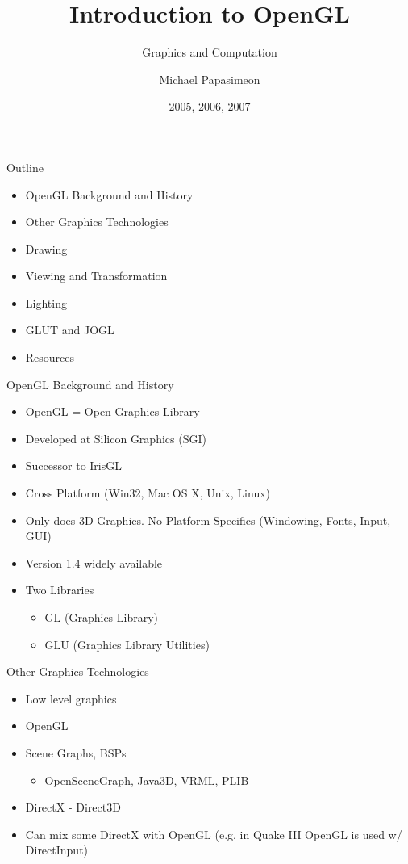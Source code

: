 \documentclass[xcolor=dvipsnames,t]{beamer}
\title[OpenGL]{Introduction to OpenGL}
\subtitle{Graphics and Computation}
\author{Michael Papasimeon} %
\date{2005, 2006, 2007}
\begin{document}
\begin{frame}
    \maketitle
\end{frame} 

\begin{frame}{Outline}
    \begin{itemize}
        \item OpenGL Background and History
        \item Other Graphics Technologies
        \item Drawing
        \item Viewing and Transformation
        \item Lighting
        \item GLUT and JOGL
        \item Resources
    \end{itemize} 
\end{frame}

\begin{frame}{OpenGL Background and History} 
    \begin{itemize}
        \item OpenGL = Open Graphics Library
        \item Developed at Silicon Graphics (SGI)
        \item Successor to IrisGL
        \item Cross Platform (Win32, Mac OS X, Unix, Linux)
        \item Only does 3D Graphics. No Platform Specifics (Windowing, Fonts, Input, GUI)
        \item Version 1.4 widely available
        \item Two Libraries
        \begin{itemize}
            \item GL (Graphics Library)
            \item GLU (Graphics Library Utilities)
        \end{itemize} 
    \end{itemize} 
\end{frame} 

\begin{frame}{Other Graphics Technologies} 
    \begin{itemize}
        \item Low level graphics
        \item OpenGL
        \item Scene Graphs, BSPs
            \begin{itemize}
                \item OpenSceneGraph, Java3D, VRML, PLIB
            \end{itemize} 
        \item DirectX - Direct3D
        \item Can mix some DirectX with OpenGL (e.g. in Quake III OpenGL is used w/ DirectInput)
    \end{itemize} 
\end{frame} 
\end{document}
